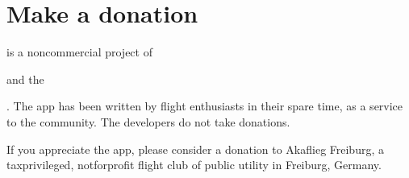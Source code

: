 \documentclass[letterpaper,10pt,english]{sphinxmanual}
\begin{document}
\chapter{Make a donation}
\label{\detokenize{02-steps/donate:make-a-donation}}\label{\detokenize{02-steps/donate::doc}}
\sphinxAtStartPar
{} is a non\sphinxhyphen{}commercial project of %
\begin{footnote}[18]\sphinxAtStartFootnote
{}
%
\end{footnote} and the %
\begin{footnote}[19]\sphinxAtStartFootnote
{}
%
\end{footnote}. The app has been written by flight enthusiasts
in their spare time, as a service to the community. The developers do not take
donations.

\sphinxAtStartPar
If you appreciate the app, please consider a donation to Akaflieg Freiburg, a
tax\sphinxhyphen{}privileged, not\sphinxhyphen{}for\sphinxhyphen{}profit flight club of public utility in Freiburg,
Germany.

\begin{sphinxVerbatim}[commandchars=\\\{\}]
         
     
     
   
\end{sphinxVerbatim}
\end{document}
